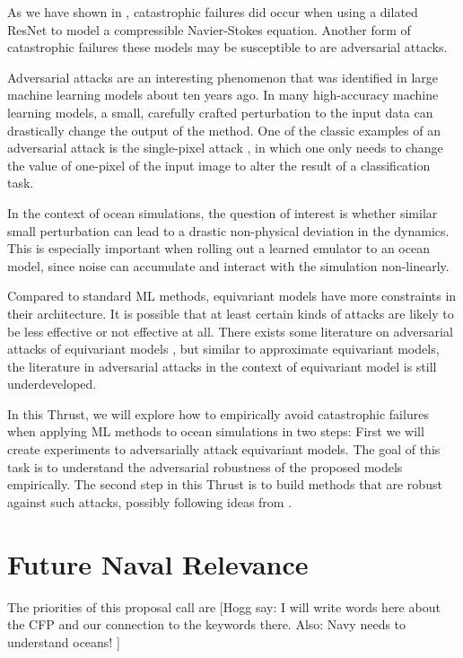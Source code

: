 \documentclass[11pt]{article}
\newcommand{\hogg}[1]{{\color{red}[Hogg say: #1 ]}}
\begin{document}
As we have shown in \cite{gregory2024robust}, catastrophic failures did occur when using a dilated ResNet to model a compressible Navier-Stokes equation. Another form of catastrophic failures these models may be susceptible to are adversarial attacks.


Adversarial attacks are an interesting phenomenon that was identified in large machine learning models \cite{goodfellow2014explaining} about ten years ago. In many high-accuracy machine learning models, a small, carefully crafted perturbation to the input data can drastically change the output of the method. One of the classic examples of an adversarial attack is the single-pixel attack \cite{su2019one}, in which one only needs to change the value of one-pixel of the input image to alter the result of a classification task.

In the context of ocean simulations, the question of interest is whether similar small perturbation can lead to a drastic non-physical deviation in the dynamics. This is especially important when rolling out a learned emulator to an ocean model, since noise can accumulate and interact with the simulation non-linearly.

Compared to standard ML methods, equivariant models have more constraints in their architecture. It is possible that at least certain kinds of attacks are likely to be less effective or not effective at all.  There exists some literature on adversarial attacks of equivariant models \cite{schuchardt2023provable}, but similar to approximate equivariant models, the literature in adversarial attacks in the context of equivariant model is still underdeveloped. 

In this Thrust, we will explore how to empirically avoid catastrophic failures when applying ML methods to ocean simulations in two steps: First we will create experiments to adversarially attack equivariant models. The goal of this task is to understand the adversarial robustness of the proposed models empirically. The second step in this Thrust is to build methods that are robust against such attacks, possibly following ideas from \cite{schuchardt2023provable}.

\section{Future Naval Relevance}
The priorities of this proposal call are \hogg{I will write words here about the CFP and our connection to the keywords there. Also: Navy needs to understand oceans!}
\end{document}

